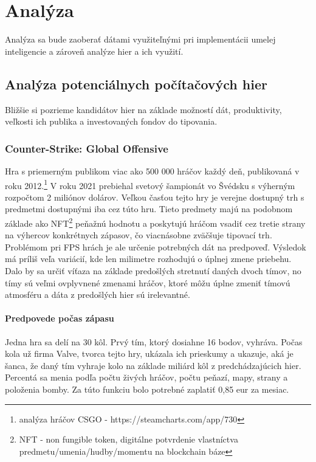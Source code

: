 
\chapter{Analýza}

Analýza sa bude zaoberať dátami využiteľnými pri implementácii umelej inteligencie a zároveň analýze hier a ich využití.

\section{Analýza potenciálnych počítačových hier}
Bližšie si pozrieme kandidátov hier na základe možností dát, produktivity, veľkosti ich publika a investovaných fondov do tipovania.

\subsection{Counter-Strike: Global Offensive}
Hra s priemerným publikom viac ako 500 000 hráčov každý deň, publikovaná v roku 2012.\footnote{analýza hráčov CSGO - https://steamcharts.com/app/730} V roku 2021 prebiehal svetový šampionát vo Švédsku s výherným rozpočtom 2 miliónov dolárov. Veľkou časťou tejto hry je verejne dostupný trh s predmetmi dostupnými iba cez túto hru. Tieto predmety majú na podobnom základe ako NFT\footnote {
	NFT - non fungible token, digitálne potvrdenie vlastníctva predmetu/umenia/hudby/momentu na blockchain báze} peňažnú hodnotu a poskytujú hráčom vsadiť cez tretie strany na výhercov konkrétnych zápasov, čo viacnásobne zväčšuje tipovací trh. Problémom pri FPS hrách je ale určenie potrebných dát na predpoveď. Výsledok má príliš veľa variácií, kde len milimetre rozhodujú o úplnej zmene priebehu. Dalo by sa určiť víťaza na základe predošlých stretnutí daných dvoch tímov, no tímy sú veľmi ovplyvnené zmenami hráčov, ktoré môžu úplne zmeniť tímovú atmosféru a dáta z predošlých hier sú irelevantné.

 \subsubsection{Predpovede počas zápasu}
 Jedna hra sa delí na 30 kôl. Prvý tím, ktorý dosiahne 16 bodov, vyhráva. Počas kola už firma Valve, tvorca tejto hry, ukázala ich prieskumy a ukazuje, aká je šanca, že daný tím vyhraje kolo na základe miliárd kôl z predchádzajúcich hier. Percentá sa menia podľa počtu živých hráčov, počtu peňazí, mapy, strany a položenia bomby. Za túto funkciu bolo potrebné zaplatiť 0,85 eur za mesiac.
